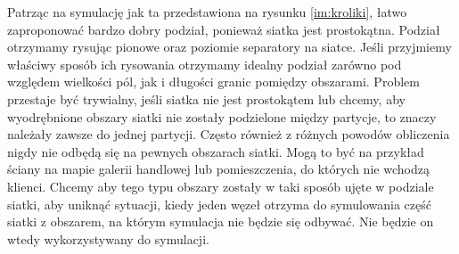 Patrząc na symulację jak ta przedstawiona na rysunku \ref{im:kroliki}, łatwo zaproponować bardzo dobry podział, ponieważ
siatka jest prostokątna.
Podział otrzymamy rysując pionowe oraz poziomie separatory na siatce.
Jeśli przyjmiemy właściwy sposób ich rysowania otrzymamy idealny podział zarówno pod względem wielkości pól, jak i
długości granic pomiędzy obszarami.
Problem przestaje być trywialny, jeśli siatka nie jest prostokątem lub chcemy, aby wyodrębnione obszary
siatki nie zostały podzielone między partycje, to znaczy należały zawsze do jednej partycji.
Często również z różnych powodów obliczenia nigdy nie odbędą się na pewnych obszarach siatki.
Mogą to być na przykład ściany na mapie galerii handlowej lub pomieszczenia, do których nie wchodzą klienci.
Chcemy aby tego typu obszary zostały w taki sposób ujęte w podziale siatki, aby uniknąć sytuacji, kiedy
jeden węzeł otrzyma do symulowania część siatki z obszarem, na którym symulacja nie będzie się odbywać.
Nie będzie on wtedy wykorzystywany do symulacji.
